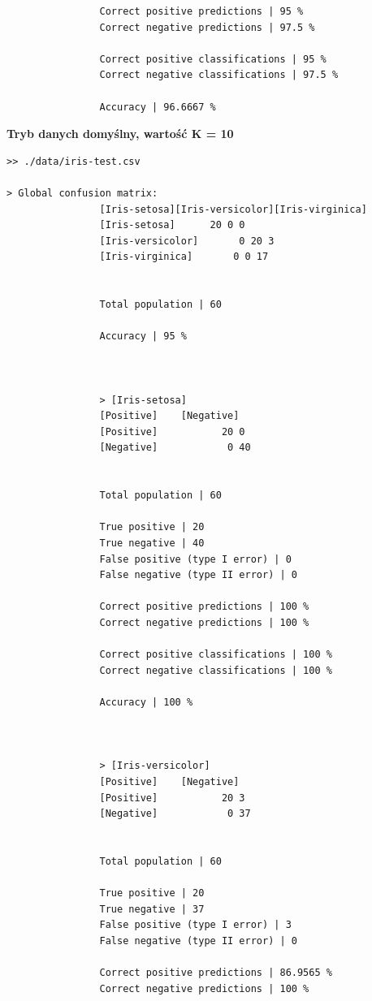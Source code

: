 \documentclass{classrep}
\begin{document}
{{{\begin{lstlisting}
                Correct positive predictions | 95 %
                Correct negative predictions | 97.5 %

                Correct positive classifications | 95 %
                Correct negative classifications | 97.5 %

                Accuracy | 96.6667 %
                \end{lstlisting}
                \textbf{Tryb danych domyślny, wartość K = 10}
                \begin{lstlisting}
>> ./data/iris-test.csv

> Global confusion matrix:
                [Iris-setosa][Iris-versicolor][Iris-virginica]
                [Iris-setosa]      20 0 0
                [Iris-versicolor]       0 20 3
                [Iris-virginica]       0 0 17


                Total population | 60

                Accuracy | 95 %



                > [Iris-setosa]
                [Positive]    [Negative]
                [Positive]           20 0
                [Negative]            0 40


                Total population | 60

                True positive | 20
                True negative | 40
                False positive (type I error) | 0
                False negative (type II error) | 0

                Correct positive predictions | 100 %
                Correct negative predictions | 100 %

                Correct positive classifications | 100 %
                Correct negative classifications | 100 %

                Accuracy | 100 %



                > [Iris-versicolor]
                [Positive]    [Negative]
                [Positive]           20 3
                [Negative]            0 37


                Total population | 60

                True positive | 20
                True negative | 37
                False positive (type I error) | 3
                False negative (type II error) | 0

                Correct positive predictions | 86.9565 %
                Correct negative predictions | 100 %


\end{lstlisting}}}}
\end{document}
